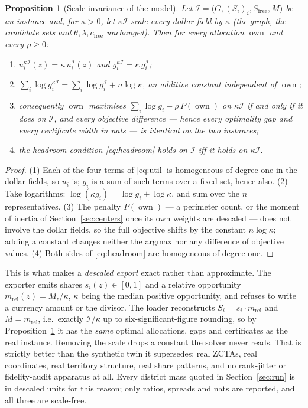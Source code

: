 \documentclass[11pt]{article}
\newtheorem{prop}{Proposition}
\theoremstyle{definition}
\newcommand{\Sfree}{S_{\mathrm{free}}}
\newcommand{\cfree}{c_{\mathrm{free}}}
\newcommand{\owner}{\operatorname{own}}
\begin{document}
\begin{prop}[Scale invariance of the model]\label{prop:scale}
Let $\mathcal I=\bigl(G,(S_i)_i,\Sfree,M\bigr)$ be an instance and, for $\kappa>0$, let
$\kappa\mathcal I$ scale every dollar field by $\kappa$ (the graph, the candidate sets and
$\theta,\lambda,\cfree$ unchanged). Then for every allocation $\owner$ and every $\rho\ge0$:
\begin{enumerate}
\item $u_i^{\kappa\mathcal I}(z)=\kappa\,u_i^{\mathcal I}(z)$ and
$g_i^{\kappa\mathcal I}=\kappa\,g_i^{\mathcal I}$;
\item $\sum_i\log g_i^{\kappa\mathcal I} = \sum_i\log g_i^{\mathcal I} + n\log\kappa$,
an additive constant independent of $\owner$;
\item consequently $\owner$ maximises $\sum_i\log g_i-\rho\,P(\owner)$ on
$\kappa\mathcal I$ if and only if it does on $\mathcal I$, and every objective
\emph{difference} --- hence every optimality gap and every certificate width in nats ---
is identical on the two instances;
\item the headroom condition \eqref{eq:headroom} holds on $\mathcal I$ iff it holds on
$\kappa\mathcal I$.
\end{enumerate}
\end{prop}

\begin{proof}
(1) Each of the four terms of \eqref{eq:util} is homogeneous of degree one in the dollar
fields, so $u_i$ is; $g_i$ is a sum of such terms over a fixed set, hence also. (2) Take
logarithms: $\log(\kappa g_i)=\log g_i+\log\kappa$, and sum over the $n$ representatives.
(3) The penalty $P(\owner)$ --- a perimeter count, or the moment of inertia of
Section~\ref{sec:centers} once its own weights are descaled --- does not involve the dollar
fields, so the full objective shifts by the constant $n\log\kappa$; adding a constant
changes neither the argmax nor any difference of objective values.
(4) Both sides of \eqref{eq:headroom} are homogeneous of degree one.
\end{proof}

This is what makes a \emph{descaled export} exact rather than approximate. The exporter
emits shares $s_i(z)\in[0,1]$ and a relative opportunity $m_{\mathrm{rel}}(z)=M_z/\kappa$,
$\kappa$ being the median positive opportunity, and refuses to write a currency amount or
the divisor. The loader reconstructs $S_i=s_i\cdot m_{\mathrm{rel}}$ and
$M=m_{\mathrm{rel}}$, i.e.\ exactly $\mathcal I/\kappa$ up to six-significant-figure
rounding, so by Proposition~\ref{prop:scale} it has the \emph{same} optimal allocations,
gaps and certificates as the real instance. Removing the scale drops a constant the solver
never reads. That is strictly better than the synthetic twin it supersedes: real ZCTAs,
real coordinates, real territory structure, real share patterns, and no rank-jitter or
fidelity-audit apparatus at all. Every district mass quoted in Section~\ref{sec:run} is in
descaled units for this reason; only ratios, spreads and nats are reported, and all three
are scale-free.
\end{document}
